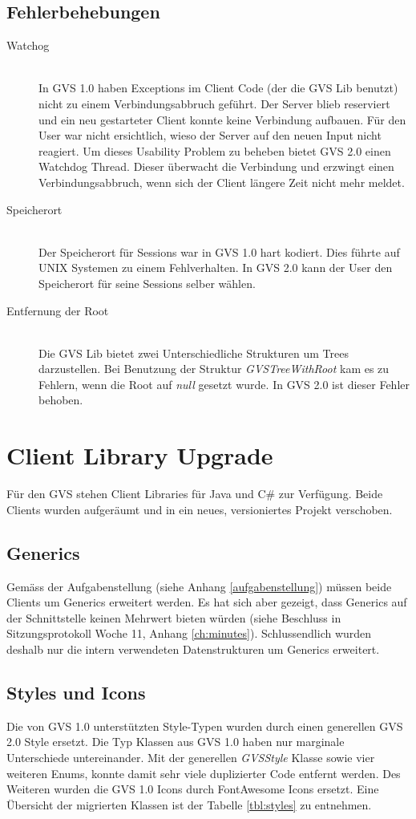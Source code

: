 \documentclass[11pt,a4paper,english,oneside]{book}
\numberwithin{equation}{chapter}
\begin{document}
	\subsection{Fehlerbehebungen}
	\begin{description}
		\item[Watchog] \hfill \\ In GVS 1.0 haben Exceptions im Client Code (der die GVS Lib benutzt) nicht zu einem Verbindungsabbruch geführt. Der Server blieb reserviert und ein neu gestarteter Client konnte keine Verbindung aufbauen. Für den User war nicht ersichtlich, wieso der Server auf den neuen Input nicht reagiert. Um dieses Usability Problem zu beheben bietet GVS 2.0 einen Watchdog Thread. Dieser überwacht die Verbindung und erzwingt einen Verbindungsabbruch, wenn sich der Client längere Zeit nicht mehr meldet.
		\item[Speicherort]  \hfill \\ Der Speicherort für Sessions war in GVS 1.0 hart kodiert. Dies führte auf UNIX Systemen zu einem Fehlverhalten. In GVS 2.0 kann der User den Speicherort für seine Sessions selber wählen.
		\item[Entfernung der Root] \hfill \\ Die GVS Lib bietet zwei Unterschiedliche Strukturen um Trees darzustellen. Bei Benutzung der Struktur \textit{GVSTreeWithRoot} kam es zu Fehlern, wenn die Root auf \textit{null} gesetzt wurde. In GVS 2.0 ist dieser Fehler behoben.
	\end{description}


	\section{Client Library Upgrade}
	Für den GVS stehen Client Libraries für Java und C\# zur Verfügung. Beide Clients wurden aufgeräumt und in ein neues, versioniertes Projekt verschoben.
	
	\subsection{Generics}
	Gemäss der Aufgabenstellung (siehe Anhang \ref{aufgabenstellung}) müssen beide Clients um Generics erweitert werden. Es hat sich aber gezeigt, dass Generics auf der Schnittstelle keinen Mehrwert bieten würden (siehe Beschluss in Sitzungsprotokoll Woche 11, Anhang \ref{ch:minutes}). Schlussendlich wurden deshalb nur die intern verwendeten Datenstrukturen um Generics erweitert.
	
	\subsection{Styles und Icons}
	Die von GVS 1.0 unterstützten Style-Typen wurden durch einen generellen GVS 2.0 Style ersetzt. Die Typ Klassen aus GVS 1.0 haben nur marginale Unterschiede untereinander. Mit der generellen \textit{GVSStyle} Klasse sowie vier weiteren Enums, konnte damit sehr viele duplizierter Code entfernt werden. Des Weiteren wurden die GVS 1.0 Icons durch FontAwesome Icons ersetzt. Eine Übersicht der migrierten Klassen ist der Tabelle \ref{tbl:styles} zu entnehmen.
	
\end{document}
